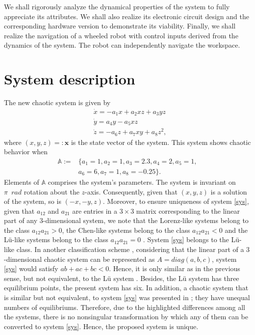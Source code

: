 \documentclass[final,5p,times,twocolumn]{elsarticle}
\begin{document}
We shall rigorously analyze the dynamical properties of the system to fully appreciate its attributes. We shall also realize its electronic circuit design and the corresponding hardware version to demonstrate its viability. Finally, we shall realize the navigation of a wheeled robot with control inputs derived from the dynamics of the system. The robot can independently navigate the workspace.

\section{System description\label{secmath}}
The new chaotic system is given by
\begin{equation}
\begin{split}
&\dot{x} = -a_1x+a_2xz+a_3yz\\
&\dot{y} = a_4y-a_5xz\\
&\dot{z} = -a_6z+a_7xy+a_8z^2\label{sys},
\end{split}
\end{equation}
where $(x,y,z)=:\bm{x}$ is the state vector of the system. This system shows chaotic behavior when
\begin{equation}
\begin{split}
\mathbb{A} := &\{a_1 = 1, a_2 = 1, a_3 = 2.3, a_4 = 2, a_5 = 1,\\&a_6 = 6, a_7 = 1, a_8 =-0.25\}.	
\end{split}
\end{equation}
Elements of $\mathbb{A}$ comprises the system's parameters. The system is invariant on $\pi\enspace rad$ rotation about the $z$-axis. Consequently, given that $(x,y,z)$ is a solution of the system, so is $(-x,-y,z)$. 
Moreover, to ensure uniqueness of system \eqref{sys}, given that $a_{12}$ and $a_{21}$ are entries in a $3\times{3}$ matrix corresponding to the linear part of any $3$-dimensional system, we note that the Lorenz-like systems belong to the class $a_{12}a_{21}>0$, the Chen-like systems belong to the class $a_{12}a_{21}<0$ and the L\"{u}-like systems belong to the class $a_{12}a_{21}=0$ \cite{lu2004new,lu2002dynamical}. System \eqref{sys} belongs to the L\"{u}-like class. In another classification scheme \cite{liu2003new}, considering that the linear part of a $3$-dimensional chaotic system can be represented as $A = diag(a,b,c)$, system \eqref{sys} would satisfy $ab+ac+bc<0$. Hence, it is only similar as in the previous sense, but not equivalent, to the L\"{u} system \cite{lu2002new}. Besides, the L\"{u} system has three equilibrium points, the present system has six. In addition, a chaotic system that is similar but not equivalent, to system \eqref{sys} was presented in \cite{zhou2017new}; they have unequal numbers of equilibriums. Therefore, due to the highlighted differences among all the systems, there is no nonsingular transformation by which any of them can be converted to system \eqref{sys}. Hence, the proposed system is unique.
\end{document}
